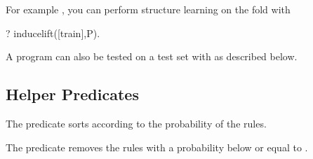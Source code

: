 \documentclass[letterpaper,10pt,english]{sphinxmanual}
\begin{document}
\sphinxAtStartPar
For example , you can perform structure learning on the  fold with

\begin{sphinxVerbatim}[commandchars=\\\{\}]
?\PYGZhy{} induce\PYGZus{}lift([train],P).
\end{sphinxVerbatim}

\sphinxAtStartPar
A program can also be tested on a test set with   as described below.


\subsection{Helper Predicates}
\label{\detokenize{index:helper-predicates}}
\begin{sphinxVerbatim}[commandchars=\\\{\}]
  
\end{sphinxVerbatim}

\sphinxAtStartPar
The predicate sorts  according to the probability of the rules.

\begin{sphinxVerbatim}[commandchars=\\\{\}]
  
\end{sphinxVerbatim}

\sphinxAtStartPar
The predicate removes the rules with a probability below or equal to .

\begin{sphinxVerbatim}[commandchars=\\\{\}]
  
\end{sphinxVerbatim}
\end{document}
